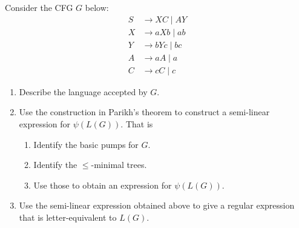 \documentclass[12pt]{article}
\begin{document}
\begin{problem*}
    Consider the CFG $G$ below:
    \begin{align*}
        S &\to XC \mid AY \\
        X &\to aXb \mid ab \\
        Y &\to bYc \mid bc \\
        A &\to aA \mid a \\
        C &\to cC \mid c
    \end{align*}
    \begin{enumerate}[label=(\alph*)]
        \item Describe the language accepted by $G$.
        \item Use the construction in Parikh’s theorem to construct a
        semi-linear expression for $\psi(L(G))$.
        That is \begin{enumerate}[label=\roman*.]
            \item Identify the basic pumps for $G$.
            \item Identify the $\le$-minimal trees.
            \item Use those to obtain an expression for $\psi(L(G))$.
        \end{enumerate}
        \item Use the semi-linear expression obtained above to give a
        regular expression that is letter-equivalent to $L(G)$.
    \end{enumerate}
\end{problem*}
\end{document}
